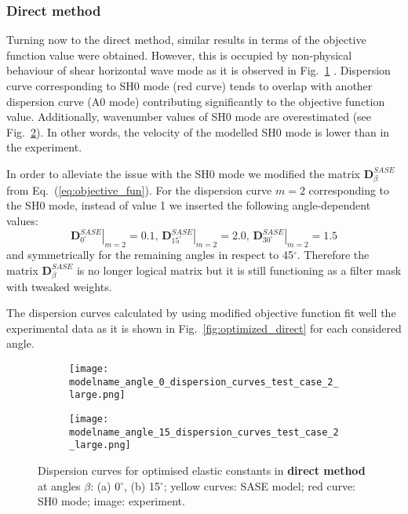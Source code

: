 \documentclass[preprint,12pt]{elsarticle}
\newcommand{\matr}[1]{\mathbf{#1}} %
\begin{document}
\clearpage
\subsubsection{Direct method}
Turning now to the direct method, similar results in terms of the objective function value were obtained.  However, this is occupied by non-physical behaviour of shear horizontal wave mode as it is observed in Fig.~\ref{fig:dispersion0deg_direct_SH0} . Dispersion curve corresponding to SH0 mode (red curve) tends to overlap with another dispersion curve (A0 mode) contributing significantly to the objective function value. Additionally, wavenumber values of SH0 mode are overestimated (see Fig.~\ref{fig:dispersion15deg_direct_SH0}). In other words, the velocity of the modelled SH0 mode is lower than in the experiment.

In order to alleviate the issue with the SH0 mode we modified the matrix $\matr{D}^{SASE}_{\beta} $  from Eq.~(\ref{eq:objective_fun}). For the dispersion curve $m=2$ corresponding to the SH0 mode, instead of value 1 we inserted the following angle-dependent values:
\begin{equation}
\left. \matr{D}^{SASE}_{0^{\circ}}\right\vert_{m=2} = 0.1, \, \left. \matr{D}^{SASE}_{15^{\circ}}\right\vert_{m=2} = 2.0, \, \left. \matr{D}^{SASE}_{30^{\circ}}\right\vert_{m=2} = 1.5
\label{eq:objective_fun_mod}
\end{equation}	
and symmetrically for the remaining angles in respect to 45$^{\circ}$. Therefore the matrix $\matr{D}^{SASE}_{\beta} $ is no longer logical matrix but it is still functioning as a filter mask with tweaked weights.

The dispersion curves calculated by using modified objective function fit well the experimental data as it is shown in Fig.~\ref{fig:optimized_direct} for each considered angle. 
\begin{figure} [h!]
	\newcommand{\modelname}{ga_plain_weave_C_tensor_known_mass_50}
	\centering
	\begin{subfigure}[b]{\textwidth}
		\centering
		\texttt{[image: \\modelname\_angle\_0\_dispersion\_curves\_test\_case\_2\_large.png]}
		\caption{}
		\label{fig:dispersion0deg_direct_SH0}
	\end{subfigure}
	\begin{subfigure}[b]{\textwidth}
		\centering
		\texttt{[image: \\modelname\_angle\_15\_dispersion\_curves\_test\_case\_2\_large.png]}
		\caption{}
		\label{fig:dispersion15deg_direct_SH0}
	\end{subfigure}
	\caption{Dispersion curves for optimised elastic constants in \textbf{direct method} at angles $\beta$: (a) 0$^{\circ}$, (b) 15$^{\circ}$; yellow curves: SASE model; red curve: SH0 mode; image: experiment. }
	\label{fig:SH0_problem}
\end{figure}
\end{document}
